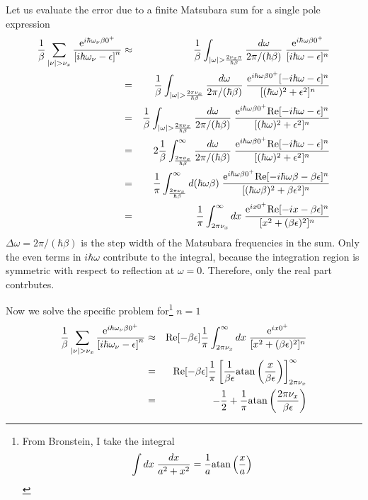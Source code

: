 \documentclass[11pt,a4paper]{report}
\begin{document}
Let us evaluate the error due to a finite Matsubara sum for a single
pole expression
\begin{eqnarray}
\frac{1}{\beta}\sum_{|\nu|>\nu_x}
\frac{\e{i\hbar\omega_\nu\beta0^+}}{\left[i\hbar\omega_\nu-\epsilon\right]^n}
&\approx&
\frac{1}{\beta}\int_{|\omega|>\frac{2\nu_x\pi}{\hbar\beta}}
\frac{d\omega}{2\pi/(\hbar\beta)}\;
\frac{\e{i\hbar\omega\beta0^+}}{[i\hbar\omega-\epsilon]^n}
\nonumber\\
&=&
\frac{1}{\beta}\int_{|\omega|>\frac{2\pi\nu_x}{\hbar\beta}}
\frac{d\omega}{2\pi/(\hbar\beta)}\;
\frac{\e{i\hbar\omega\beta0^+}[-i\hbar\omega-\epsilon]^n
}{[(\hbar\omega)^2+\epsilon^2]^n}
\nonumber\\
&=&
\frac{1}{\beta}\int_{|\omega|>\frac{2\pi\nu_x}{\hbar\beta}}
\frac{d\omega}{2\pi/(\hbar\beta)}\;
\frac{\e{i\hbar\omega\beta0^+}\Re[-i\hbar\omega-\epsilon]^n
}{[(\hbar\omega)^2+\epsilon^2]^n}
\nonumber\\
&=&
2\frac{1}{\beta}\int_{\frac{2\pi\nu_x}{\hbar\beta}}^\infty
\frac{d\omega}{2\pi/(\hbar\beta)}\;
\frac{\e{i\hbar\omega\beta0^+}\Re[-i\hbar\omega-\epsilon]^n
}{[(\hbar\omega)^2+\epsilon^2]^n}
\nonumber\\
&=&
\frac{1}{\pi}\int_{\frac{2\pi\nu_x}{\hbar\beta}}^\infty
d(\hbar\omega\beta)\;
\frac{\e{i\hbar\omega\beta0^+}\Re[-i\hbar\omega\beta-\beta\epsilon]^n
}{[(\hbar\omega\beta)^2+\beta\epsilon^2]^n}
\nonumber\\
&=&
\frac{1}{\pi}\int_{2\pi\nu_x}^\infty dx\;
\frac{\e{ix0^+}\Re[-ix-\beta\epsilon]^n
}{[x^2+(\beta\epsilon)^2]^n}
\end{eqnarray}
$\Delta\omega=2\pi/(\hbar\beta)$ is the step width of the Matsubara
frequencies in the sum. Only the even terms in $i\hbar\omega$
contribute to the integral, because the integration region is
symmetric with respect to reflection at $\omega=0$. Therefore, only the
real part contrbutes.

Now we solve the specific problem for\footnote{From Bronstein, I take the integral
\begin{eqnarray}
\int dx\;\frac{dx}{a^2+x^2}=\frac{1}{a}{\rm atan}\left(\frac{x}{a}\right)
\end{eqnarray}
} $n=1$
\begin{eqnarray}
\frac{1}{\beta}\sum_{|\nu|>\nu_x}
\frac{\e{i\hbar\omega_\nu\beta0^+}}{\left[i\hbar\omega_\nu-\epsilon\right]^n}
&\approx&
\Re[-\beta\epsilon]
\frac{1}{\pi}\int_{2\pi\nu_x}^\infty dx\;
\frac{\e{ix0^+}}{[x^2+(\beta\epsilon)^2]^n}
\nonumber\\
&=&\Re[-\beta\epsilon]\frac{1}{\pi}
\left[\frac{1}{\beta\epsilon}\atan\left(\frac{x}{\beta\epsilon}\right)\right]
_{2\pi\nu_x}^\infty 
\nonumber\\
&=&
-\frac{1}{2}
+\frac{1}{\pi}\atan\left(\frac{2\pi\nu_x}{\beta\epsilon}\right)
\end{eqnarray}
\end{document}
